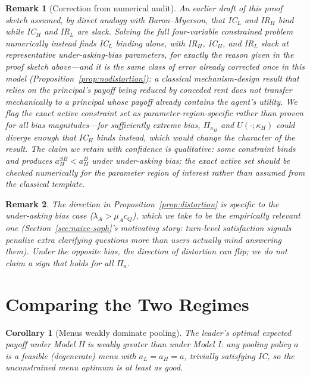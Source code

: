 \documentclass[11pt]{article}
\newtheorem{corollary}{Corollary}
\newtheorem{remark}{Remark}
\begin{document}
\begin{remark}[Correction from numerical audit]
An earlier draft of this proof sketch assumed, by direct analogy with
Baron--Myerson, that IC$_L$ and IR$_H$ bind while IC$_H$ and IR$_L$ are slack.
Solving the full four-variable constrained problem numerically instead finds
IC$_L$ binding alone, with IR$_H$, IC$_H$, and IR$_L$ slack at representative
under-asking-bias parameters, for exactly the reason given in the proof sketch
above---and it is the same class of error already corrected once in this model
(Proposition~\ref{prop:nodistortion}): a classical mechanism-design result that
relies on the principal's payoff being reduced by conceded rent does not
transfer mechanically to a principal whose payoff already contains the agent's
utility. We flag the exact active constraint set as parameter-region-specific
rather than proven for all bias magnitudes---for sufficiently extreme bias,
$\Pi_{\kappa_H}$ and $U(\cdot;\kappa_H)$ could diverge enough that IC$_H$ binds
instead, which would change the character of the result. The claim we retain
with confidence is qualitative: some constraint binds and produces
$a_H^{SB}<a_H^{B}$ under under-asking bias; the exact active set should be
checked numerically for the parameter region of interest rather than assumed
from the classical template.
\end{remark}

\begin{remark}
The direction in Proposition~\ref{prop:distortion} is specific to the
under-asking bias case ($\lambda_A>\mu_A c_Q$), which we take to be the
empirically relevant one (Section~\ref{sec:naive-soph}'s motivating story: turn-level
satisfaction signals penalize extra clarifying questions more than users actually
mind answering them). Under the opposite bias, the direction of distortion can
flip; we do not claim a sign that holds for all $\Pi_\kappa$.
\end{remark}

\section{Comparing the Two Regimes}
\label{sec:compare}

\begin{corollary}[Menus weakly dominate pooling]
The leader's optimal expected payoff under Model II is weakly greater than under
Model I: any pooling policy $a$ is a feasible (degenerate) menu with
$a_L=a_H=a$, trivially satisfying IC, so the unconstrained menu optimum is at
least as good.
\end{corollary}
\end{document}

